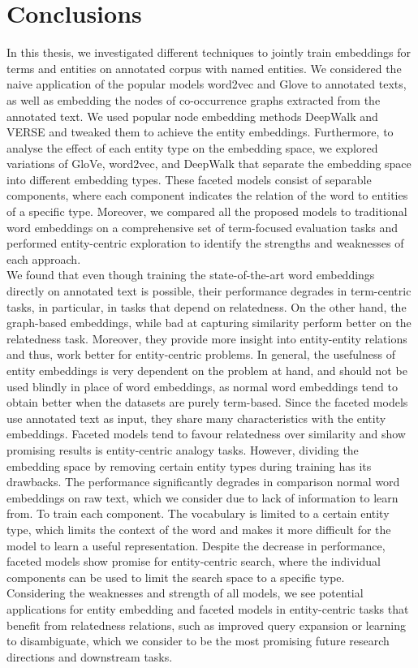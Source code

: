 \chapter{Conclusions}\label{chap:concl}

In this thesis, we investigated different techniques to jointly train embeddings for terms and entities on annotated corpus with named entities. We considered the naive application of the popular models word2vec and Glove to annotated texts, as well as embedding the nodes of co-occurrence graphs extracted from the annotated text. We used popular node embedding methods DeepWalk and VERSE and tweaked them to achieve the entity embeddings. Furthermore, to analyse the effect of each entity type on the embedding space, we explored variations of GloVe, word2vec, and DeepWalk that separate the embedding space into different embedding types. These faceted models consist of separable components, where each component indicates the relation of the word to entities of a specific type. Moreover, we compared all the proposed models to traditional word embeddings on a comprehensive set of term-focused evaluation tasks and performed entity-centric exploration to identify the strengths and weaknesses of each approach. \\
We found that even though training the state-of-the-art word embeddings directly on annotated text is possible, their performance degrades in term-centric tasks, in particular, in tasks that depend on relatedness. On the other hand, the graph-based embeddings, while bad at capturing similarity perform better on the relatedness task. Moreover, they provide more insight into entity-entity relations and thus, work better for entity-centric problems. In general, the usefulness of entity embeddings is very dependent on the problem at hand, and should not be used blindly in place of word embeddings, as normal word embeddings tend to obtain better when the datasets are purely term-based. Since the faceted models use annotated text as input, they share many characteristics with the entity embeddings. Faceted models tend to favour relatedness over similarity and show promising results is entity-centric analogy tasks. However, dividing the embedding space by removing certain entity types during training has its drawbacks. The performance significantly degrades in comparison normal word embeddings on raw text, which we consider due to lack of information to learn from. To train each component. The vocabulary is limited to a certain entity type, which limits the context of the word and makes it more difficult for the model to learn a useful representation. Despite the decrease in performance, faceted models show promise for entity-centric search, where the individual components can be used to limit the search space to a specific type. \\
Considering the weaknesses and strength of all models, we see potential applications for entity embedding and faceted models in entity-centric tasks that benefit from relatedness relations, such as improved query expansion or learning to disambiguate, which we consider to be the most promising future research directions and downstream tasks.\\